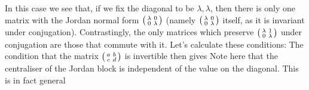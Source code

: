 \documentclass{article}
\begin{document}
In this case we see that, if we fix the diagonal to be $\lambda, \lambda$, then there is only one matrix with the Jordan normal form $\begin{psmallmatrix} \lambda & 0 \\ 0 & \lambda \end{psmallmatrix}$ (namely $\begin{psmallmatrix} \lambda & 0 \\ 0 & \lambda \end{psmallmatrix}$ itself, as it is invariant under conjugation). Contrastingly, the only matrices which preserve $\begin{psmallmatrix} \lambda & 1 \\ 0 & \lambda \end{psmallmatrix}$ under conjugation are those that commute with it. Let's calculate these conditions:
The condition that the matrix $\begin{psmallmatrix} a & b \\ c & d \end{psmallmatrix}$ is invertible then gives 
Note here that the centraliser of the Jordan block is independent of the value on the diagonal. This is in fact general
\end{document}

